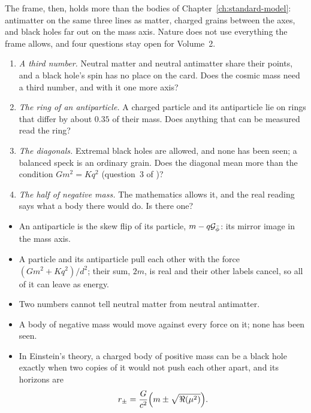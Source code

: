 The frame, then, holds more than the bodies of Chapter~\ref{ch:standard-model}: antimatter on the same three lines as matter, charged grains between the axes, and black holes far out on the mass axis. Nature does not use everything the frame allows, and four questions stay open for Volume~2.
\begin{enumerate}
  \item \emph{A third number.} Neutral matter and neutral antimatter share their points, and a black hole's spin has no place on the card. Does the cosmic mass need a third number, and with it one more axis?
  \item \emph{The ring of an antiparticle.} A charged particle and its antiparticle lie on rings that differ by about $0.35$ of their mass. Does anything that can be measured read the ring?
  \item \emph{The diagonals.} Extremal black holes are allowed, and none has been seen; a balanced speck is an ordinary grain. Does the diagonal mean more than the condition $G m^2 = K q^2$ (question~3 of )?
  \item \emph{The half of negative mass.} The mathematics allows it, and the real reading says what a body there would do. Is there one?
\end{enumerate}

\begin{plainwords}
\begin{itemize}
  \item An antiparticle is the skew flip of its particle, $m - q\mathcal{G}_{\bar{\phi}}$: its mirror image in the mass axis.
  \item A particle and its antiparticle pull each other with the force \mbox{$(G m^2 + K q^2)/d^2$}; their sum, $2m$, is real and their other labels cancel, so all of it can leave as energy.
  \item Two numbers cannot tell neutral matter from neutral antimatter.
  \item A body of negative mass would move against every force on it; none has been seen.
  \item In Einstein's theory, a charged body of positive mass can be a black hole exactly when two copies of it would not push each other apart, and its horizons are
  \[
  r_\pm = \frac{G}{c^2}\Bigl(m \pm \sqrt{\Re(\mu^2)}\Bigr) .
  \]
\end{itemize}
\end{plainwords}
